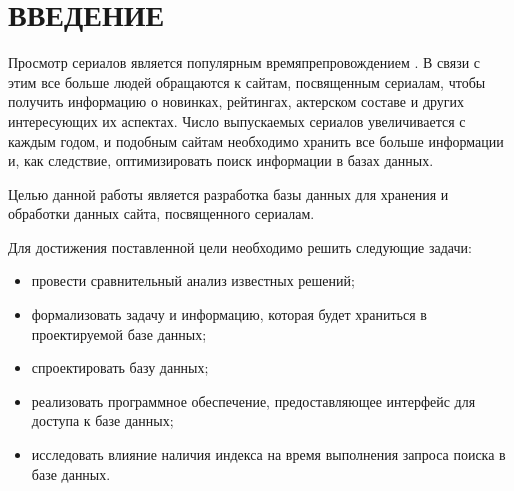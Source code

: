 \chapter*{ВВЕДЕНИЕ}

Просмотр сериалов является популярным времяпрепровождением \cite{intro-serials}. 
В связи с этим все больше людей обращаются к сайтам, посвященным сериалам, чтобы получить информацию о новинках, рейтингах, актерском составе и других интересующих их аспектах.
Число выпускаемых сериалов увеличивается с каждым годом, и подобным сайтам необходимо хранить все больше информации и, как следствие, оптимизировать поиск информации в базах данных.

Целью данной работы является разработка базы данных для хранения и обработки данных сайта, посвященного сериалам.

Для достижения поставленной цели необходимо решить следующие задачи:
\begin{itemize}[label=---]
    \item провести сравнительный анализ известных решений;
    \item формализовать задачу и информацию, которая будет храниться в проектируемой базе данных;
    \item спроектировать базу данных;
    \item реализовать программное обеспечение, предоставляющее интерфейс для доступа к базе данных;
    \item исследовать влияние наличия индекса на время выполнения запроса поиска в базе данных.
\end{itemize}